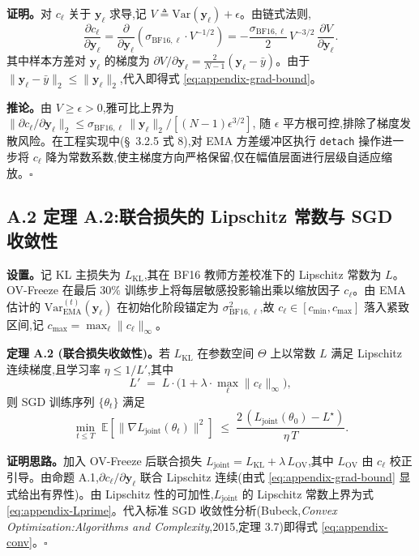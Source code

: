 \documentclass[11pt, a4paper]{article}
\begin{document}
\noindent\textbf{证明。}\quad 对 $c_\ell$ 关于 $\bm{y}_\ell$ 求导,记 $V \triangleq \mathrm{Var}(\bm{y}_\ell)+\epsilon$。由链式法则,
\[
\frac{\partial c_\ell}{\partial \bm{y}_\ell}
=
\frac{\partial}{\partial \bm{y}_\ell}\!
\left(\sigma_{\mathrm{BF16},\ell}\cdot V^{-1/2}\right)
=
-\frac{\sigma_{\mathrm{BF16},\ell}}{2}\,V^{-3/2}\,\frac{\partial V}{\partial \bm{y}_\ell}.
\]
其中样本方差对 $\bm{y}_\ell$ 的梯度为 $\partial V/\partial \bm{y}_\ell = \frac{2}{N-1}(\bm{y}_\ell-\bar{y})$。由于 $\|\bm{y}_\ell-\bar y\|_2\le\|\bm{y}_\ell\|_2$,代入即得式 \eqref{eq:appendix-grad-bound}。

\noindent\textbf{推论。}\quad 由 $V\ge\epsilon>0$,雅可比上界为
$\|\partial c_\ell/\partial\bm{y}_\ell\|_2 \le \sigma_{\mathrm{BF16},\ell}\,\|\bm{y}_\ell\|_2/[(N-1)\epsilon^{3/2}]$,
随 $\epsilon$ 平方根可控,排除了梯度发散风险。在工程实现中(\S~3.2.5 式 8),对 EMA 方差缓冲区执行 \texttt{detach} 操作进一步将 $c_\ell$ 降为常数系数,使主梯度方向严格保留,仅在幅值层面进行层级自适应缩放。\hfill$\square$

\subsection*{A.2 定理 A.2:联合损失的 Lipschitz 常数与 SGD 收敛性}

\noindent\textbf{设置。}\quad 记 KL 主损失为 $L_{\mathrm{KL}}$,其在 BF16 教师方差校准下的 Lipschitz 常数为 $L$。OV-Freeze 在最后 $30\%$ 训练步上将每层敏感投影输出乘以缩放因子 $c_\ell$。由 EMA 估计的 $\mathrm{Var}^{(t)}_{\mathrm{EMA}}(\bm{y}_\ell)$ 在初始化阶段锚定为 $\sigma^2_{\mathrm{BF16},\ell}$,故 $c_\ell\in[c_{\min},c_{\max}]$ 落入紧致区间,记 $c_{\max} = \max_\ell\|c_\ell\|_\infty$。

\noindent\textbf{定理 A.2 (联合损失收敛性)。}\quad 若 $L_{\mathrm{KL}}$ 在参数空间 $\Theta$ 上以常数 $L$ 满足 Lipschitz 连续梯度,且学习率 $\eta\le 1/L'$,其中
\begin{equation}
\label{eq:appendix-Lprime}
L' \;=\; L\cdot\bigl(1+\lambda\cdot\max_\ell\|c_\ell\|_\infty\bigr),
\end{equation}
则 SGD 训练序列 $\{\theta_t\}$ 满足
\begin{equation}
\label{eq:appendix-conv}
\min_{t\le T}\;\mathbb{E}\!\left[\|\nabla L_{\mathrm{joint}}(\theta_t)\|^2\right]
\;\le\;
\frac{2\,(L_{\mathrm{joint}}(\theta_0)-L^\star)}{\eta\,T}.
\end{equation}

\noindent\textbf{证明思路。}\quad 加入 OV-Freeze 后联合损失 $L_{\mathrm{joint}}=L_{\mathrm{KL}}+\lambda\,L_{\mathrm{OV}}$,其中 $L_{\mathrm{OV}}$ 由 $c_\ell$ 校正引导。由命题 A.1,$\partial c_\ell/\partial \bm{y}_\ell$ 联合 Lipschitz 连续(由式 \eqref{eq:appendix-grad-bound} 显式给出有界性)。由 Lipschitz 性的可加性,$L_{\mathrm{joint}}$ 的 Lipschitz 常数上界为式 \eqref{eq:appendix-Lprime}。代入标准 SGD 收敛性分析(Bubeck,\textit{Convex Optimization:Algorithms and Complexity},2015,定理 3.7)即得式 \eqref{eq:appendix-conv}。\hfill$\square$
\end{document}
